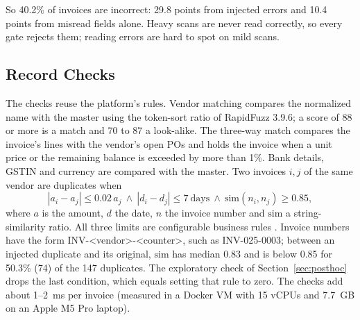 \documentclass[conference]{IEEEtran}
\begin{document}
So 40.2\% of invoices are incorrect: 29.8 points from injected errors and 10.4
points from misread fields alone. Heavy scans are never read correctly, so every
gate rejects them; reading errors are hard to spot on mild scans.

\subsection{Record Checks}
The checks reuse the platform's rules. Vendor matching compares the normalized
name with the master using the token-sort ratio of RapidFuzz 3.9.6; a score of 88 or more is a match and 70 to 87 a look-alike.
The three-way match compares the invoice's lines with the vendor's open POs and
holds the invoice when a unit price or the remaining balance is exceeded by more
than 1\%. Bank details, GSTIN and currency are compared with the master. Two
invoices $i,j$ of the same vendor are duplicates when
\begin{equation}
|a_i-a_j|\le 0.02\,a_j \ \wedge\ |d_i-d_j|\le 7\ \text{days}\ \wedge\
\mathrm{sim}(n_i,n_j)\ge 0.85,
\label{eq:dup}
\end{equation}
where $a$ is the amount, $d$ the date, $n$ the invoice number and $\mathrm{sim}$
a string-similarity ratio. All three limits are configurable business
rules \cite{more2026report}. Invoice numbers have the form INV-<vendor>-<counter>, such as INV-025-0003; between an injected duplicate and its original, $\mathrm{sim}$ has
median 0.83 and is below 0.85 for 50.3\% (74) of the 147 duplicates.
The exploratory check of Section~\ref{sec:posthoc} drops the last condition,
which equals setting that rule to zero. The checks add about 1--2~ms per invoice (measured in a Docker VM with 15 vCPUs and 7.7~GB on an Apple M5 Pro laptop).
\end{document}
